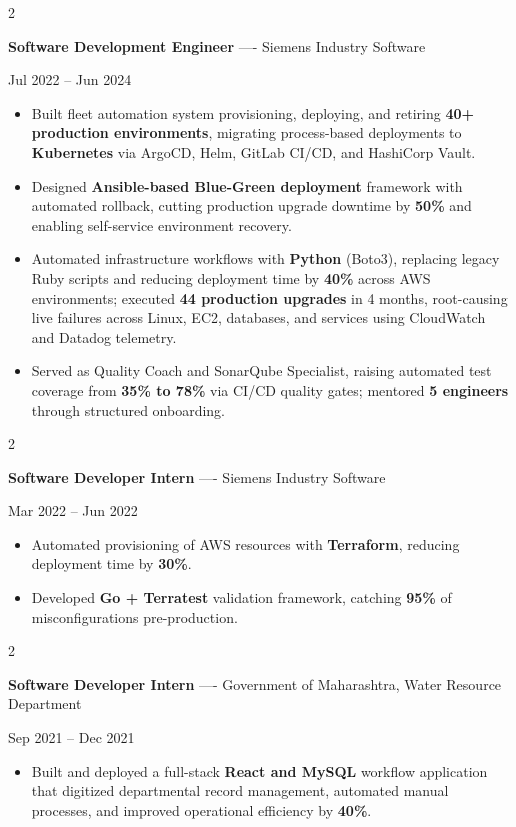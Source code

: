\documentclass[10pt, letterpaper]{article}
\newenvironment{highlights}{
    \begin{itemize}[
        topsep=0.10 cm,
        parsep=0.06 cm,
        partopsep=0pt,
        itemsep=0.06 cm,
        leftmargin=12pt
    ]
}{
    \end{itemize}
}
\newenvironment{twocolentry}[2][]{
    \onecolentry
    \def\secondColumn{#2}
    \setcolumnwidth{\fill, 4.5 cm}
    \begin{paracol}{2}
}{
    \switchcolumn \raggedleft \secondColumn
    \end{paracol}
    \endonecolentry
}
\begin{document}
\vspace{0.15 cm}

\begin{twocolentry}{Jul 2022 -- Jun 2024}
\textbf{Software Development Engineer} ---- Siemens Industry Software
\end{twocolentry}
\begin{highlights}
  \item Built fleet automation system provisioning, deploying, and retiring \textbf{40+ production environments}, migrating process-based deployments to \textbf{Kubernetes} via ArgoCD, Helm, GitLab CI/CD, and HashiCorp Vault.
  \item Designed \textbf{Ansible-based Blue-Green deployment} framework with automated rollback, cutting production upgrade downtime by \textbf{50\%} and enabling self-service environment recovery.
  \item Automated infrastructure workflows with \textbf{Python} (Boto3), replacing legacy Ruby scripts and reducing deployment time by \textbf{40\%} across AWS environments; executed \textbf{44 production upgrades} in 4 months, root-causing live failures across Linux, EC2, databases, and services using CloudWatch and Datadog telemetry.
  \item Served as Quality Coach and SonarQube Specialist, raising automated test coverage from \textbf{35\% to 78\%} via CI/CD quality gates; mentored \textbf{5 engineers} through structured onboarding.
\end{highlights}

\vspace{0.15 cm}

\begin{twocolentry}{Mar 2022 -- Jun 2022}
\textbf{Software Developer Intern} ---- Siemens Industry Software
\end{twocolentry}
\begin{highlights}
  \item Automated provisioning of AWS resources with \textbf{Terraform}, reducing deployment time by \textbf{30\%}.
  \item Developed \textbf{Go + Terratest} validation framework, catching \textbf{95\%} of misconfigurations pre-production.
\end{highlights}

\vspace{0.15 cm}

\begin{twocolentry}{Sep 2021 -- Dec 2021}
\textbf{Software Developer Intern} ---- Government of Maharashtra, Water Resource Department
\end{twocolentry}
\begin{highlights}
  \item Built and deployed a full-stack \textbf{React and MySQL} workflow application that digitized departmental record management, automated manual processes, and improved operational efficiency by \textbf{40\%}.
\end{highlights}
\end{document}
